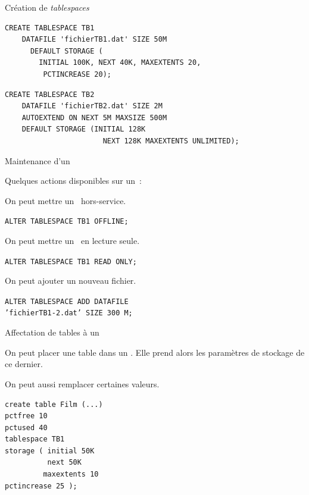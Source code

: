 \begin{frame}[fragile]{Création de  {\it tablespaces}}

\begin{verbatim}
CREATE TABLESPACE TB1
    DATAFILE 'fichierTB1.dat' SIZE 50M
      DEFAULT STORAGE (
        INITIAL 100K, NEXT 40K, MAXEXTENTS 20,
         PCTINCREASE 20);
\end{verbatim}

\vfill
\begin{verbatim}
CREATE TABLESPACE TB2 
    DATAFILE 'fichierTB2.dat' SIZE 2M
    AUTOEXTEND ON NEXT 5M MAXSIZE 500M
    DEFAULT STORAGE (INITIAL 128K
                       NEXT 128K MAXEXTENTS UNLIMITED);
\end{verbatim}


\end{frame}

\begin{frame}{Maintenance d'un \tbspace}

Quelques actions 
disponibles sur un \tbspace\,:

\begin{redbullet}
  \item On peut mettre un \tbspace\ hors-service.

\texttt{ALTER TABLESPACE TB1 OFFLINE;}

  \item On peut mettre un \tbspace\ en lecture seule.

\texttt{ALTER TABLESPACE TB1 READ ONLY;}

  \item   On peut ajouter un nouveau fichier.

\texttt{ALTER TABLESPACE ADD DATAFILE \\
'fichierTB1-2.dat' SIZE 300 M;}

\end{redbullet}

\end{frame}

\begin{frame}[fragile]{Affectation de tables à un \tbspace}

On peut placer une table dans un \tbspace. Elle
prend alors les paramètres de stockage de ce dernier.

\vfill

On peut aussi remplacer certaines valeurs.

\vfill

\begin{verbatim}
create table Film (...)
pctfree 10
pctused 40
tablespace TB1
storage ( initial 50K
          next 50K
         maxextents 10
pctincrease 25 );
\end{verbatim}

\end{frame}